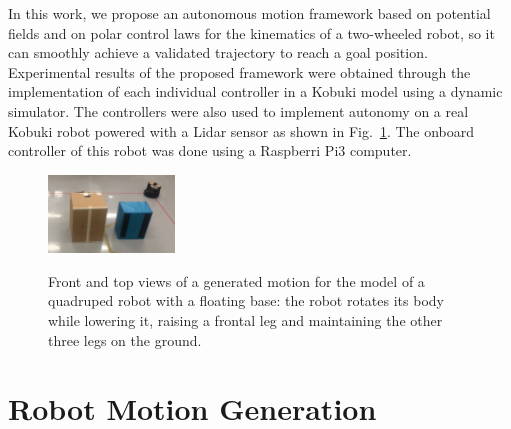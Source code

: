 \documentclass[conference]{IEEEtran}
\begin{document}
In this work, we propose an autonomous motion framework based on potential fields and on polar control laws for the kinematics of a two-wheeled robot, so it can smoothly achieve a validated trajectory to reach a goal position. Experimental results of the proposed framework were obtained through the implementation of each individual controller in a Kobuki model using a dynamic simulator. The controllers were also used to implement autonomy on a real Kobuki robot powered with a Lidar sensor as shown in Fig.~\ref{fig:example-robot}.  The onboard controller of this robot was done using a Raspberri Pi3 computer.

\begin{figure}%
  \centering \footnotesize
  \subfloat
  {\includegraphics[width=0.3\textwidth]{kobuki}}
  \captionsetup{font=footnotesize}
  \caption{Front and top views of a generated motion for the model of a
    quadruped robot with a floating base: the robot rotates its body while
    lowering it, raising a frontal leg and maintaining the other three legs on
    the ground.}
  \label{fig:example-robot}
\end{figure}


\section{Robot Motion Generation}
\label{sec:robot_motion}
\end{document}
